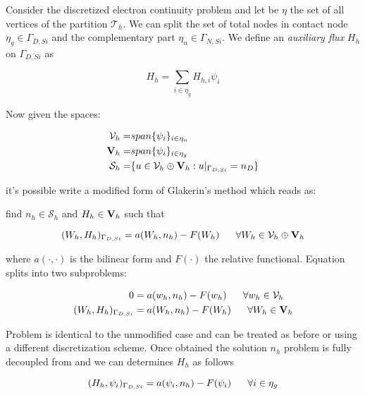 Consider the discretized electron continuity problem  and let be $\eta$  the set of all vertices of the partition $\mathcal{T}_h$.  We can split the set of total nodes in contact node $\eta_g \in \Gamma_{D,Si}$ and the complementary part $\eta_n \in \Gamma_{N,Si}$. We define an \textit{auxiliary flux} $H_h$ on $\Gamma_{D,Si}$ as

\begin{equation}
H_h = \sum_{i\in\eta_g} H_{h,i} \psi_i 
\end{equation}


Now given the spaces:

\begin{align*}
\mathcal{V}_h = & span\{\psi_i\}_{i \in \eta_n} \\
\mathbf{V}_h = & span\{\psi_i\}_{i \in \eta_g}  \\
\mathcal{S}_h = & \{u \in \mathcal{V}_h \oplus \mathbf{V}_h: u|_{\Gamma_{D,Si}} = n_D \}
\end{align*}

it's possible write a modified form of Glakerin's method which reads as: 

find $n_h  \in \mathcal{S}_h$ and $H_h \in \mathbf{V}_h$ such that

\begin{equation}
\label{eq: modified galerkin}
(W_h,H_h)_{\Gamma_{D,Si}} = a(W_h,n_h)-F(W_h) \psp{10} \forall W_h \in \mathcal{V}_h \oplus \vect{V}_h
\end{equation}

where $a(\cdot,\cdot)$ is the bilinear form  and $F(\cdot)$ the relative functional.
Equation  splits into two subproblems:

\begin{align}
0  & = a(w_h,n_h)-F(w_h) \psp{10} \forall w_h \in \mathcal{V}_h \label{eq: usual problem}\\
(W_h,H_h)_{\Gamma_{D,Si}} & = a(W_h,n_h)-F(W_h) \psp{10} \forall W_h \in \vect{V}_h \label{eq: flux problem}
\end{align}

Problem  is identical to the unmodified case and can be treated as before or using a different discretization scheme. Once obtained the solution $n_h$ problem  is fully decoupled from  and we can determines $H_h$ as follows

\begin{equation}
\label{eq: flux problem complete}
(H_h,\psi_i)_{\Gamma_{D,Si}} = a(\psi_i,n_h)-F(\psi_i) \psp{10} \forall i \in \eta_g 
\end{equation} 


